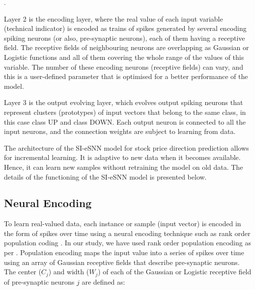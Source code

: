 .

Layer 2 is the encoding layer, where the real value of each input variable (technical indicator) is encoded as trains of spikes generated by several encoding spiking neurons (or also, pre-synaptic neurons), each of them having a receptive field. The receptive fields of neighbouring neurons are overlapping as Gaussian or Logistic functions and all of them covering the whole range of the values of this variable. The number of these encoding neurons (receptive fields) can vary, and this is a user-defined parameter that is optimised for a better performance
of the model.

Layer 3 is the output evolving layer, which evolves output spiking neurons that represent clusters (prototypes) of input vectors that belong to the same class, in this case class UP and
class DOWN. Each output neuron is connected to all the input neurons, and the connection weights are subject to learning from data.

The architecture of the SI-eSNN model for stock price direction prediction allows for incremental learning. It is adaptive to new data when it becomes available. Hence, it can learn new samples without retraining the model on old data. The details of the functioning of the SI-eSNN model is
presented below.

\subsection{Neural Encoding}

To learn real-valued data, each instance or sample (input vector) is encoded in the form of spikes over time using a neural encoding technique such as rank order population coding \citep{thorpe1997rapid,bohte2002error}. In our study, we have used rank order population encoding as per \citep{schliebs2009integrated}. Population encoding maps the input value into a series of spikes over time using an array of Gaussian receptive fields that describe pre-synaptic neurons. The center ($C_j$) and width ($W_j$) of each of the Gaussian or Logistic receptive field of pre-synaptic neurons $j$ are defined as:

